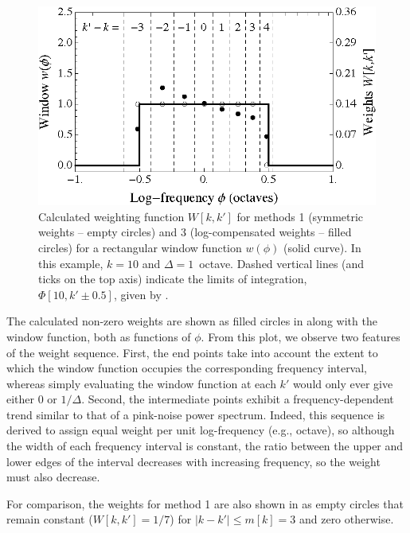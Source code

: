 \begin{figure}[t]
    \centering
    \includegraphics[width=0.6\columnwidth]{a3_smoothing_weights/figures/RectangularWeightsExample.eps}
    \caption[Calculated smoothing weights for a rectangular window function.]{
    Calculated weighting function $W[k,k']$ for methods 1 (symmetric weights -- empty circles) and 3 (log-compensated weights -- filled circles) for a rectangular window function $w(\phi)$ (solid curve).
In this example, $k = 10$ and $\Delta = 1$~octave.
Dashed vertical lines (and ticks on the top axis) indicate the limits of integration, $\Phi[10, k' \pm 0.5]$, given by .}
    \label{fig:A3_Smoothing_Weights:RectangularWeightsExample}
\end{figure}

The calculated non-zero weights are shown as filled circles in  along with the window function, both as functions of $\phi$.
From this plot, we observe two features of the weight sequence.
First, the end points take into account the extent to which the window function occupies the corresponding frequency interval, whereas simply evaluating the window function at each $k'$ would only ever give either 0 or $1/\Delta$.
Second, the intermediate points exhibit a frequency-dependent trend similar to that of a pink-noise power spectrum.
Indeed, this sequence is derived to assign equal weight per unit log-frequency (e.g., octave), so although the width of each frequency interval is constant, the ratio between the upper and lower edges of the interval decreases with increasing frequency, so the weight must also decrease.

For comparison, the weights for method 1 are also shown in  as empty circles that remain constant ($W[k,k'] = 1/7$) for $| k - k' | \leq m[k] = 3$ and zero otherwise.
